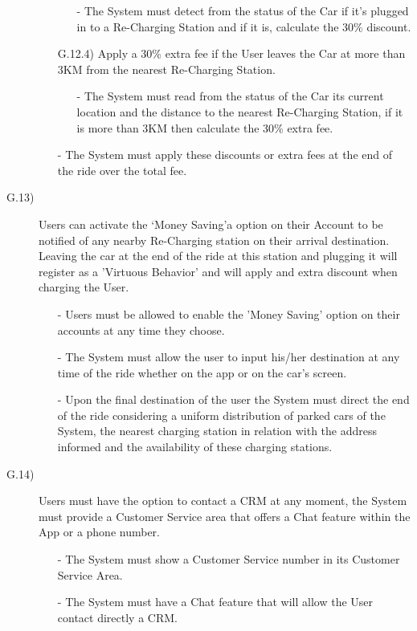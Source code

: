 \documentclass[a4paper]{article}
\begin{document}
\begin{description}
\begin{itemize}
	\begin{itemize}
	\item[-]The System must detect from the status of the Car if it's plugged in to a Re-Charging Station and if it is, calculate the 30\% discount.
	\end{itemize}
	\item [G.12.4)]Apply a 30\% extra fee if the User leaves the Car at more than 3KM from the nearest Re-Charging Station.
	\begin{itemize}
	\item[-]The System must read from the status of the Car its current location and the distance to the nearest Re-Charging Station, if it is more than 3KM then calculate the 30\% extra fee.
	\end{itemize}
	\item[-]The System must apply these discounts or extra fees at the end of the ride over the total fee.
\end{itemize}

\item [G.13)]Users can activate the `Money Saving'a option on their Account to be notified of any nearby Re-Charging station on their arrival destination. Leaving the car at the end of the ride at this station and plugging it will register as a 'Virtuous Behavior' and will apply and extra discount when charging the User.
\begin{itemize}
	\item[-]Users must be allowed to enable the 'Money Saving' option on their accounts at any time they choose.
	\item[-]The System must allow the user to input his/her destination at any time of the ride whether on the app or on the car's screen.
	\item[-]Upon the final destination of the user the System must direct the end of the ride considering a uniform distribution of parked cars of the System, the nearest charging station in relation with the address informed and  the availability of these charging stations.
\end{itemize}
\item [G.14)]Users must have the option to contact a CRM at any moment, the System must provide a Customer Service area that offers a Chat feature within the App or a phone number.
\begin{itemize}
	\item[-]The System must show a Customer Service number in its Customer Service Area.
	\item[-]The System must have a Chat feature that will allow the User contact directly a CRM.
\end{itemize}
\end{description}
\end{document}
